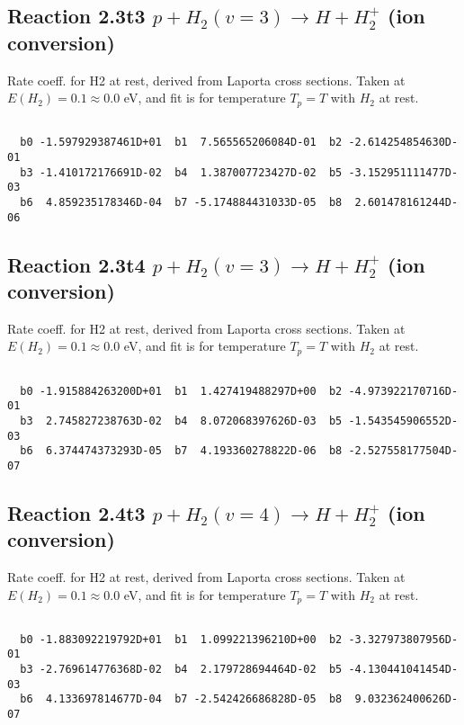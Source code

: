 \documentclass[12pt,dvipdfmx]{article}
\begin{document}
\newpage
\subsection{
Reaction 2.3t3
$ p + H_2(v=3) \rightarrow H + H_2^+$ (ion conversion)
}
Rate coeff. for H2 at rest, derived from Laporta cross sections.
Taken at $E(H_2) = 0.1 \approx 0.0$ eV,  and fit is for temperature $T_p=T$ with $H_2$ at rest.

\begin{small}\begin{verbatim}

  b0 -1.597929387461D+01  b1  7.565565206084D-01  b2 -2.614254854630D-01
  b3 -1.410172176691D-02  b4  1.387007723427D-02  b5 -3.152951111477D-03
  b6  4.859235178346D-04  b7 -5.174884431033D-05  b8  2.601478161244D-06

\end{verbatim}\end{small}

\newpage
\subsection{
Reaction 2.3t4
$ p + H_2(v=3) \rightarrow H + H_2^+$ (ion conversion)
}
Rate coeff. for H2 at rest, derived from Laporta cross sections.
Taken at $E(H_2) = 0.1 \approx 0.0$ eV,  and fit is for temperature $T_p=T$ with $H_2$ at rest.

\begin{small}\begin{verbatim}

  b0 -1.915884263200D+01  b1  1.427419488297D+00  b2 -4.973922170716D-01
  b3  2.745827238763D-02  b4  8.072068397626D-03  b5 -1.543545906552D-03
  b6  6.374474373293D-05  b7  4.193360278822D-06  b8 -2.527558177504D-07

\end{verbatim}\end{small}

\newpage
\subsection{
Reaction 2.4t3
$ p + H_2(v=4) \rightarrow H + H_2^+$ (ion conversion)
}
Rate coeff. for H2 at rest, derived from Laporta cross sections.
Taken at $E(H_2) = 0.1 \approx 0.0$ eV,  and fit is for temperature $T_p=T$ with $H_2$ at rest.

\begin{small}\begin{verbatim}

  b0 -1.883092219792D+01  b1  1.099221396210D+00  b2 -3.327973807956D-01
  b3 -2.769614776368D-02  b4  2.179728694464D-02  b5 -4.130441041454D-03
  b6  4.133697814677D-04  b7 -2.542426686828D-05  b8  9.032362400626D-07

\end{verbatim}\end{small}
\end{document}

